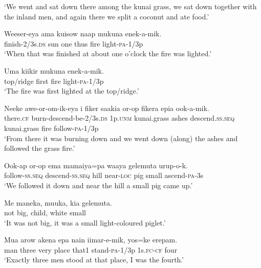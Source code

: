 \glt ‘We went and sat down there among the kunai grass, we sat down together with the inland men, and again there we split a coconut and ate food.’ \\
\z


\ea\label{ex:a:x8}
\gll  Weeser-eya  ama  kuisow  naap  mukuna  enek-a-mik. \\
finish-2/3s.\textsc{ds}  sun  one  thus  fire  light-\textsc{pa}-1/3p \\
\glt ‘When that was finished at about one o’clock the fire was lighted.’ \\
\z


\ea\label{ex:a:x9}
\gll  Uma  kiikir  mukuna  enek-a-mik. \\
top/ridge  first  fire  light-\textsc{pa}-1/3p \\
\glt ‘The fire was first lighted at the top/ridge.’ \\
\z


\ea\label{ex:a:x10}
\gll  Neeke  awe-or-om-ik-eya  i  fiker  saakia                or-op  fikera  epia  ook-a-mik. \\
there.\textsc{cf}  burn-descend-be-2/3s.\textsc{ds}  1p.\textsc{unm}  kunai.grass  ashes  descend.\textsc{ss.seq}  kunai.grass  fire  follow-\textsc{pa}-1/3p \\


\glt ‘From there it was burning down and we went down (along) the ashes and followed the grass fire.’ \\
\z


\ea\label{ex:a:x11}
\gll  Ook-ap  or-op  ema  mamaiya=pa  waaya  gelemuta         urup-o-k. \\
follow-\textsc{ss.seq}  descend-\textsc{ss.seq}  hill  near-\textsc{loc}  pig  small     ascend-\textsc{pa}-3s \\


\glt ‘We followed it down and near the hill a small pig came up.’ \\
\z


\ea\label{ex:a:x12}
\gll  Me  maneka,  muuka,  kia  gelemuta. \\
not  big,  child,  white  small \\
\glt ‘It was not big, it was a small light-coloured piglet.’ \\
\z


\ea\label{ex:a:x13}
\gll  Mua  arow  akena  epa  nain  iimar-e-mik,  yos=ke  erepam. \\
man  three  very  place  that1  stand-\textsc{pa}-1/3p  1s.\textsc{fc}-\textsc{cf}  four \\
\glt ‘Exactly three men stood at that place, I was the fourth.’ \\
\z


